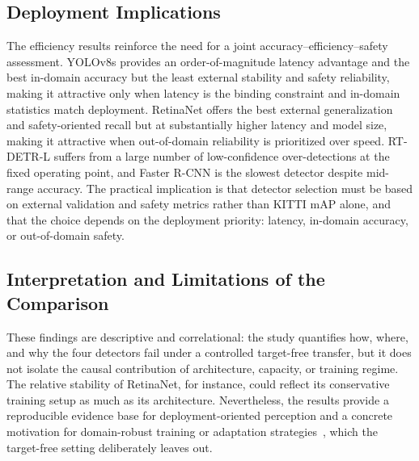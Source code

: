 \subsection{Deployment Implications}
\label{sec:discussion_deployment}

The efficiency results reinforce the need for a joint accuracy--efficiency--safety
assessment. YOLOv8s provides an order-of-magnitude latency advantage and the best in-domain
accuracy but the least external stability and safety reliability, making it attractive only
when latency is the binding constraint and in-domain statistics match deployment. RetinaNet
offers the best external generalization and safety-oriented recall but at substantially
higher latency and model size, making it attractive when out-of-domain reliability is
prioritized over speed. RT-DETR-L suffers from a large number of low-confidence
over-detections at the fixed operating point, and Faster R-CNN is the slowest detector
despite mid-range accuracy. The practical implication is that detector selection must be
based on external validation and safety metrics rather than KITTI mAP alone, and that the
choice depends on the deployment priority: latency, in-domain accuracy, or out-of-domain
safety.

\subsection{Interpretation and Limitations of the Comparison}
\label{sec:discussion_interpretation}

These findings are descriptive and correlational: the study quantifies how, where, and why
the four detectors fail under a controlled target-free transfer, but it does not isolate
the causal contribution of architecture, capacity, or training regime. The relative
stability of RetinaNet, for instance, could reflect its conservative training setup as much
as its architecture. Nevertheless, the results provide a reproducible evidence base for
deployment-oriented perception and a concrete motivation for domain-robust training or
adaptation strategies~\cite{chen2018domainadaptive,li2022crossdomainadaptive}, which the
target-free setting deliberately leaves out.
